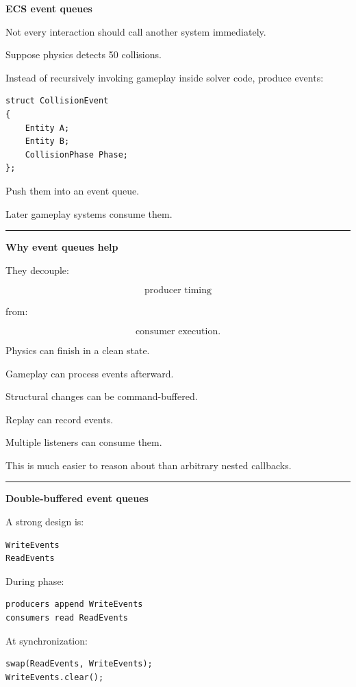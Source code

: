\textbf{ECS event queues}

Not every interaction should call another system immediately.

Suppose physics detects 50 collisions.

Instead of recursively invoking gameplay inside solver code, produce events:

\begin{verbatim}
struct CollisionEvent
{
    Entity A;
    Entity B;
    CollisionPhase Phase;
};
\end{verbatim}

Push them into an event queue.

Later gameplay systems consume them.

\begin{center}\rule{0.5\linewidth}{0.5pt}\end{center}

\textbf{Why event queues help}

They decouple:

\[
\text{producer timing}
\]

from:

\[
\text{consumer execution}.
\]

Physics can finish in a clean state.

Gameplay can process events afterward.

Structural changes can be command-buffered.

Replay can record events.

Multiple listeners can consume them.

This is much easier to reason about than arbitrary nested callbacks.

\begin{center}\rule{0.5\linewidth}{0.5pt}\end{center}

\textbf{Double-buffered event queues}

A strong design is:

\begin{verbatim}
WriteEvents
ReadEvents
\end{verbatim}

During phase:

\begin{verbatim}
producers append WriteEvents
consumers read ReadEvents
\end{verbatim}

At synchronization:

\begin{verbatim}
swap(ReadEvents, WriteEvents);
WriteEvents.clear();
\end{verbatim}

